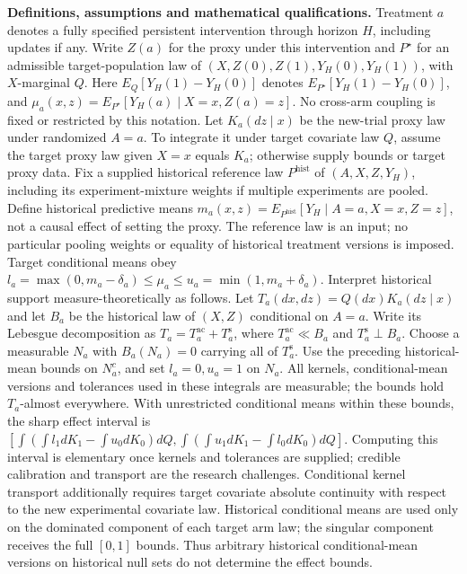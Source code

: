 \documentclass[11pt,a4paper]{article}
\begin{document}
\textbf{Definitions, assumptions and mathematical qualifications.} Treatment \(a\) denotes a fully specified persistent intervention through horizon \(H\), including updates if any. Write \(Z(a)\) for the proxy under this intervention and \(P^\star\) for an admissible target-population law of \((X,Z(0),Z(1),Y_H(0),Y_H(1))\), with \(X\)-marginal \(Q\). Here \(E_Q[Y_H(1)-Y_H(0)]\) denotes \(E_{P^\star}[Y_H(1)-Y_H(0)]\), and \(\mu_a(x,z)=E_{P^\star}[Y_H(a)\mid X=x,Z(a)=z]\). No cross-arm coupling is fixed or restricted by this notation. Let \(K_a(dz\mid x)\) be the new-trial proxy law under randomized \(A=a\). To integrate it under target covariate law \(Q\), assume the target proxy law given \(X=x\) equals \(K_a\); otherwise supply bounds or target proxy data. Fix a supplied historical reference law \(P^{\mathrm{hist}}\) of \((A,X,Z,Y_H)\), including its experiment-mixture weights if multiple experiments are pooled. Define historical predictive means \(m_a(x,z)=E_{P^{\mathrm{hist}}}[Y_H\mid A=a,X=x,Z=z]\), not a causal effect of setting the proxy. The reference law is an input; no particular pooling weights or equality of historical treatment versions is imposed. Target conditional means obey \(l_a=\max(0,m_a-\delta_a)\leq\mu_a\leq u_a=\min(1,m_a+\delta_a)\). Interpret historical support measure-theoretically as follows. Let \(T_a(dx,dz)=Q(dx)K_a(dz\mid x)\) and let \(B_a\) be the historical law of \((X,Z)\) conditional on \(A=a\). Write its Lebesgue decomposition as \(T_a=T_a^{\mathrm{ac}}+T_a^{\mathrm{s}}\), where \(T_a^{\mathrm{ac}}\ll B_a\) and \(T_a^{\mathrm{s}}\perp B_a\). Choose a measurable \(N_a\) with \(B_a(N_a)=0\) carrying all of \(T_a^{\mathrm{s}}\). Use the preceding historical-mean bounds on \(N_a^c\), and set \(l_a=0,u_a=1\) on \(N_a\). All kernels, conditional-mean versions and tolerances used in these integrals are measurable; the bounds hold \(T_a\)-almost everywhere. With unrestricted conditional means within these bounds, the sharp effect interval is \([\int(\int l_1dK_1-\int u_0dK_0)dQ,\int(\int u_1dK_1-\int l_0dK_0)dQ]\). Computing this interval is elementary once kernels and tolerances are supplied; credible calibration and transport are the research challenges. Conditional kernel transport additionally requires target covariate absolute continuity with respect to the new experimental covariate law. Historical conditional means are used only on the dominated component of each target arm law; the singular component receives the full \([0,1]\) bounds. Thus arbitrary historical conditional-mean versions on historical null sets do not determine the effect bounds.
\end{document}
